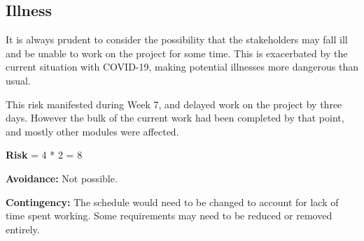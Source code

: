 \subsection{Illness}
It is always prudent to consider the possibility that the stakeholders may fall ill and be unable to work on the project for some time.
This is exacerbated by the current situation with COVID-19, making potential illnesses more dangerous than usual.

This risk manifested during Week 7, and delayed work on the project by three days.
However the bulk of the current work had been completed by that point, and mostly other modules were affected.

\textbf{Risk} = 4 * 2 = 8

\textbf{Avoidance:}
Not possible.

\textbf{Contingency:}
The schedule would need to be changed to account for lack of time spent working.
Some requirements may need to be reduced or removed entirely.

